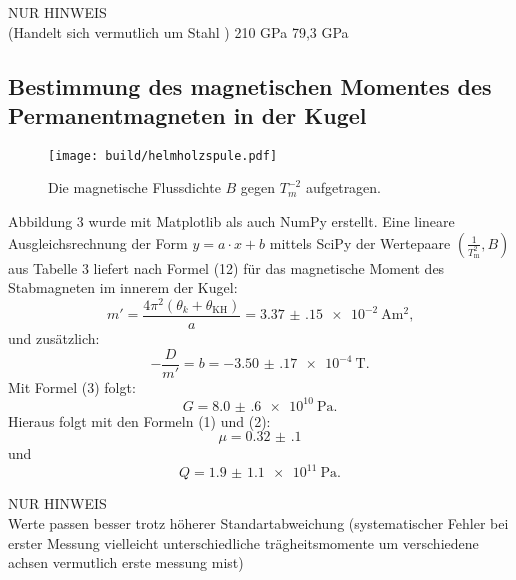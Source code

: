 NUR HINWEIS\\
(Handelt sich vermutlich um Stahl \cite[624\psq]{TaschenbuchPhysik}) 210 GPa
\cite{EinführungMechanik}  	79,3 GPa






\subsection{Bestimmung des magnetischen Momentes des Permanentmagneten in der Kugel}
\begin{figure}[H]
	\centering
	\caption{Die magnetische Flussdichte $B$ gegen $T_m ^{-2}$ aufgetragen.}
	\texttt{[image: build/helmholzspule.pdf]}
	\label{fig:grad3}
\end{figure}

Abbildung 3 wurde mit Matplotlib \cite{matplotlib} als auch NumPy \cite{numpy} erstellt.
Eine lineare Ausgleichsrechnung der Form $y = a \cdot x + b$ mittels SciPy \cite{scipy} der Wertepaare $\left(\frac{1}{T_\text{m}^2}, B\right)$ aus Tabelle 3 liefert nach Formel (12) für das magnetische Moment des Stabmagneten im innerem der Kugel:
\begin{displaymath}
	m' = \frac{4 \pi ^2 (\theta_k + \theta_{\text{KH}})}{a} = \SI{3.37(15)e-2}{\ampere\meter\squared}\text{,}
\end{displaymath}
und zusätzlich:
\begin{displaymath} 
	-\frac{D}{m'} = b =  \SI{-3.50(17)e-4}{\tesla}\text{.}
\end{displaymath}
Mit Formel (3) folgt:
\begin{displaymath} 
	G =  \SI{8.0(6)e10}{\pascal}\text{.}
\end{displaymath}
Hieraus folgt mit den Formeln (1) und (2):
\begin{displaymath}
	\mu = \num{0.32(10)}
\end{displaymath}
und
\begin{displaymath} 
	Q =  \SI{1.9(11)e11}{\pascal}\text{.}
\end{displaymath}

NUR HINWEIS\\
Werte passen besser trotz höherer Standartabweichung (systematischer Fehler bei erster Messung vielleicht unterschiedliche trägheitsmomente um verschiedene achsen vermutlich erste messung mist)





